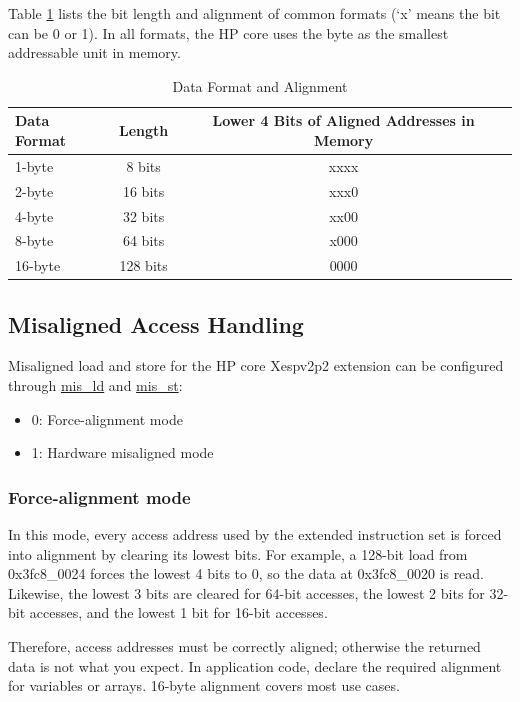 \documentclass[main\_\_EN.tex]{subfiles}
\begin{document}
Table \ref{tab:pie_data_format_align} lists the bit length and alignment of common formats (`x' means the bit can be 0 or 1). In all formats, the HP core uses the byte as the smallest addressable unit in memory.

\begin{table}[H]
\centering
\caption{Data Format and Alignment}
\label{tab:pie_data_format_align}
\begin{tabular}{|l|c|c|}
\hline
    \rowcolor{lightgray}
    \textbf{Data Format}  & \textbf{Length} & \textbf{Lower 4 Bits of Aligned Addresses in Memory} \\\hline

    1-byte & 8 bits & xxxx \\\hline
    2-byte & 16 bits & xxx0 \\\hline
    4-byte & 32 bits & xx00 \\\hline
    8-byte & 64 bits & x000 \\\hline
    16-byte & 128 bits & 0000 \\\hline
    \end{tabular}
\end{table}

\subsection{Misaligned Access Handling}

Misaligned load and store for the \chipname{} HP core Xespv2p2 extension can be configured through \hyperref[mis_ld]{mis\_ld} and \hyperref[mis_st]{mis\_st}:
\begin{itemize}
    \item 0: Force-alignment mode
    \item 1: Hardware misaligned mode
\end{itemize}



\subsubsection{Force-alignment mode}
In this mode, every access address used by the extended instruction set is forced into alignment by clearing its lowest bits. For example, a 128-bit load from 0x3fc8\_0024 forces the lowest 4 bits to 0, so the data at 0x3fc8\_0020 is read. Likewise, the lowest 3 bits are cleared for 64-bit accesses, the lowest 2 bits for 32-bit accesses, and the lowest 1 bit for 16-bit accesses.

Therefore, access addresses must be correctly aligned; otherwise the returned data is not what you expect. In application code, declare the required alignment for variables or arrays. 16-byte alignment covers most use cases.
\end{document}
